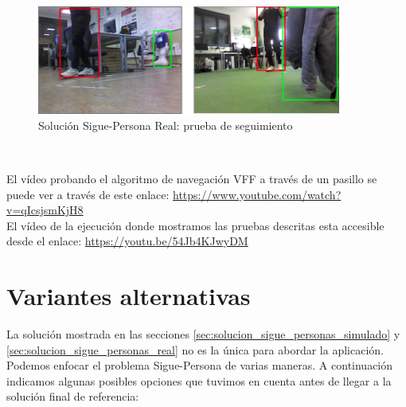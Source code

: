 \begin{itemize}
	\begin{figure} [H]
		\begin{center}
		\includegraphics[width=10cm]{imagenes/cap6/real-solucion-tracking-test.png}
		\end{center}
		\caption[Solución Sigue-Persona Real: prueba de seguimiento]{Solución Sigue-Persona Real: prueba de seguimiento}
		\label{fig:real_solucion_tracking_test}
	\end{figure}
\end{itemize}\

El vídeo probando el algoritmo de navegación VFF a través de un pasillo se puede ver a través de este enlace: \url{https://www.youtube.com/watch?v=qIcsjsmKjH8}\\

El vídeo de la ejecución donde mostramos las pruebas descritas esta accesible desde el enlace: \url{https://youtu.be/54Jb4KJwyDM}\\



\section{Variantes alternativas}
\label{sec:variantes_solucion}

La solución mostrada en las secciones \ref{sec:solucion_sigue_personas_simulado} y \ref{sec:solucion_sigue_personas_real} no es la única para abordar la aplicación. Podemos enfocar el problema Sigue-Persona de varias maneras. A continuación indicamos algunas posibles opciones que tuvimos en cuenta antes de llegar a la solución final de referencia:\\


